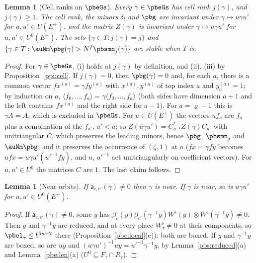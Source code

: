 \documentclass[10pt]{amsart}
\newtheorem{lemma}[theorem]{Lemma}
\theoremstyle{definition}
\theoremstyle{remark}
\begin{document}
\begin{lemma}[Cell ranks on $\pbeGs$]\label{pbs:cells}
Every $\gamma\in\pbeGs$ has cell rank $j(\gamma)$, and $j(\gamma)\ge1$. The cell rank, the minors
$\delta_l$ and $\pbg$ are invariant under $\gamma\mapsto u\gamma u'$ for $u,u'\in U(E^+)$, and the
matrix $Z(\gamma)$ is invariant under $\gamma\mapsto u\gamma u'$ for $u,u'\in U^0(E^+)$. The sets
$\{\gamma\in T:j(\gamma)=j\}$ and $\{\gamma\in T:\auNm\pbg(\gamma)>N^f\pbsmn_j(\gamma)\}$ are stable
when $T$ is.
\end{lemma}
\begin{proof}
For $\gamma\in\pbeGs$, (i) holds at $j(\gamma)$ by definition, and (ii), (iii) by
Proposition~\ref{ppi:cell}. If $j(\gamma)=0$, then $\pbg(\gamma)=0$ and, for each $a$, there is a
common vector $fx^{(a)}=\gamma fy^{(a)}$ with $x^{(a)},y^{(a)}$ of top index $a$ and $y^{(a)}_a=1$;
by induction on $a$, $\langle f_0,\dots,f_a\rangle=\gamma\langle f_0,\dots,f_a\rangle$ (both sides have
dimension $a+1$ and the left contains $fx^{(a)}$ and the right side for $a-1$). For $a=\varrho-1$
this is $\gamma A=A$, which is excluded in $\pbeGs$. For $u\in U(E^+)$ the vectors $uf_a$ are $f_a$
plus a combination of the $f_{a'}$, $a'<a$; so $Z(u\gamma u')=C_{u^{-1}}^*Z(\gamma)C_{u'}$ with
unitriangular $C$, which preserves the leading minors, hence $\pbg$, $\pbsmn_j$ and $\auNm\pbg$; and
it preserves the occurrence of $(\zeta,1)$ at $a$ ($fx=\gamma fy$ becomes $u fx=u\gamma u'(u'^{-1}fy)$,
and $u$, $u'^{-1}$ act unitriangularly on coefficient vectors). For $u,u'\in U^0$ the matrices $C$
are $1$. The last claim follows.
\end{proof}

\begin{lemma}[Near orbits]\label{pbs:near}
If $\mathsf a_{c,c'}(\gamma)\ne0$ then $\gamma$ is near. If $\gamma$ is near, so is $u\gamma u'$ for
$u,u'\in U^0(E^+)$.
\end{lemma}
\begin{proof}
If $\mathsf a_{c,c'}(\gamma)\ne0$, some $y$ has $\beta_c(y)\beta_{c'}(\gamma^{-1}y)W^\flat(y)\otimes
W^\flat(\gamma^{-1}y)\ne0$. Then $y$ and $\gamma^{-1}y$ are reduced, and at every place $W^\flat_\tau
\ne0$ at their components, so $\pbel_\tau\le b^{6n+2}$ there (Proposition~\ref{pbe:local}(e)): both
are boxed. If $y$ and $\gamma^{-1}y$ are boxed, so are $uy$ and $(u\gamma u')^{-1}uy=u'^{-1}\gamma^{-1}
y$, by Lemma~\ref{pbs:reduced}(a) and Lemma~\ref{pbe:len}(a) ($U^0\subseteq F_\tau\cap R_\tau$).
\end{proof}
\end{document}
